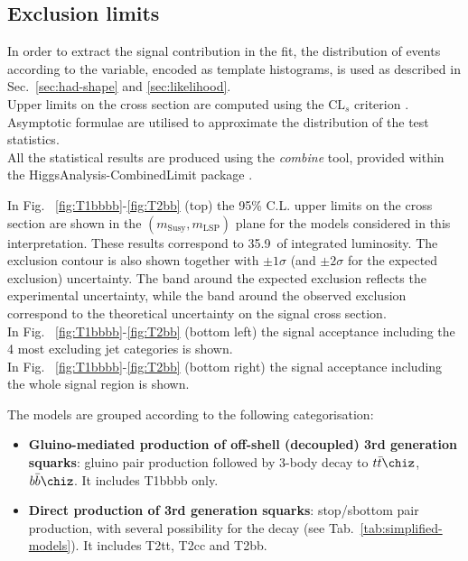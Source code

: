\subsection{Exclusion limits}
\label{sec:susy_results}
In order to extract the signal contribution in the fit, the distribution of
events according to the \mht variable, encoded as template histograms, is used
as described in Sec.~\ref{sec:had-shape} and \ref{sec:likelihood}. \\
Upper limits on the cross section are computed using the $\text{CL}_{s}$
criterion \cite{CLsTechnique}. Asymptotic formulae \cite{AsymptoticFormulae} are
utilised to approximate the distribution of the test statistics. \\
All the statistical results are produced using the \textit{combine} tool,
provided within the HiggsAnalysis-CombinedLimit package \cite{Combine}.

In Fig. ~\ref{fig:T1bbbb}-\ref{fig:T2bb} (top) the 95\% C.L. upper limits on the
cross section are shown in the $(m_{\mathrm{Susy}},m_{\mathrm{LSP}})$ plane for
the models considered in this interpretation. These results correspond to
35.9~\ifb of integrated luminosity. The exclusion contour is also shown together
with $\pm1\sigma$ (and $\pm2\sigma$ for the expected exclusion) uncertainty.
The band around the expected exclusion reflects the experimental uncertainty,
while the band around the observed exclusion correspond to the theoretical
uncertainty on the signal cross section.\\
In Fig. ~\ref{fig:T1bbbb}-\ref{fig:T2bb} (bottom left) the signal acceptance
including the 4 most excluding jet categories is shown. \\
In Fig. ~\ref{fig:T1bbbb}-\ref{fig:T2bb} (bottom right) the signal acceptance
including the whole signal region is shown.

The models are grouped according to the following categorisation:
\begin{itemize}
    \item \textbf{Gluino-mediated production of off-shell (decoupled) 3rd generation squarks}:
        gluino pair production followed by 3-body decay to $t\bar{t}\chiz$,$b\bar{b}\chiz$.
        It includes T1bbbb only.
    \item \textbf{Direct production of 3rd generation squarks}: stop/sbottom
        pair production, with several possibility for the decay
        (see Tab.~\ref{tab:simplified-models}). It includes T2tt, T2cc and T2bb.
\end{itemize}

